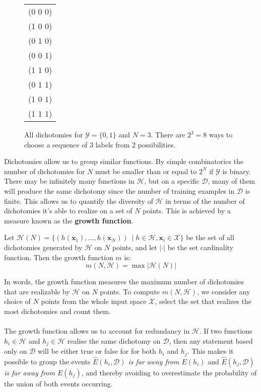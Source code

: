 \begin{figure}[h]
	\begin{center}
			\begin{tabular}{c}
		(0 0 0) \\
		(1 0 0) \\
		(0 1 0) \\
		(0 0 1) \\
		(1 1 0) \\
		(0 1 1) \\
		(1 0 1) \\
		(1 1 1) \\
	\end{tabular}
	\end{center}
	\caption{All dichotomies for $\mathcal{Y} = \{0, 1\}$ and $N = 3$. There are $2^3 = 8$ ways to choose a sequence of 3 labels from 2 possibilities.}
	\label{dichotomies}
\end{figure}

Dichotomies allow us to group similar functions. By simple combinatorics the number of dichotomies for $N$ must be smaller than or equal to $2^N$ if $\mathcal{Y}$ is binary. There may be infinitely many functions in $\mathcal{H}$, but on a specific $\mathcal{D}$, many of them will produce the same dichotomy since the number of training examples in $\mathcal{D}$ is finite.
This allows us to quantify the diversity of $\mathcal{H}$ in terms of the number of dichotomies it's able to realize on a set of $N$ points. This is achieved by a measure known as the \textbf{growth function}.
\begin{definition}
	\label{growth_function}
	Let $\mathcal{H}(N) = \{(h(\mathbf{x}_1), \dots, h(\mathbf{x}_N))\ \mid h \in \mathcal{H}, \mathbf{x}_i \in \mathcal{X}\}$ be the set of all dichotomies generated by $\mathcal{H}$ on $N$ points, and let $|\cdot|$ be the set cardinality function. Then the growth function $m$ is:
	$$
		m(N, \mathcal{H}) = \max |\mathcal{H}(N)|
	$$
\end{definition}
In words, the growth function measures the maximum number of dichotomies that are realizable by $\mathcal{H}$ on $N$ points. To compute $m(N, \mathcal{H})$, we consider any choice of $N$ points from the whole input space $\mathcal{X}$, select the set that realizes the most dichotomies and count them.
\\\\
The growth function allows us to account for redundancy in $\mathcal{H}$. If two functions $h_i \in \mathcal{H}$ and $h_j \in \mathcal{H}$ realise the same dichotomy on $\mathcal{D}$, then any statement based only on $\mathcal{D}$ will be either true or false for for both $h_i$ and $h_j$. This makes it possible to group the events \textit{$\hat{E}(h_i, \mathcal{D})$ is far away from $E(h_i)$} and \textit{$\hat{E}(h_j, \mathcal{D})$ is far away from $E(h_j)$}, and thereby avoiding to overestimate the probability of the union of both events occurring.

